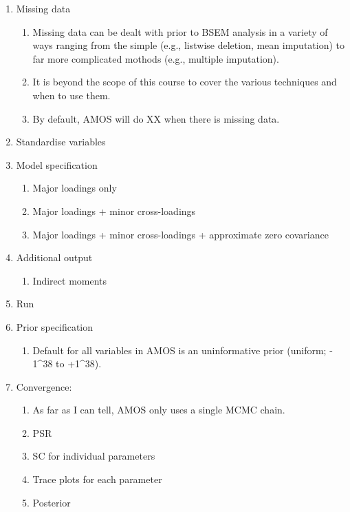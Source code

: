 \documentclass[
]{book}
\providecommand{\tightlist}{%
  \setlength{\itemsep}{0pt}\setlength{\parskip}{0pt}}
\begin{document}
\begin{enumerate}
\def\labelenumi{\arabic{enumi}.}
\tightlist
\item
  Missing data

  \begin{enumerate}
  \def\labelenumii{\arabic{enumii}.}
  \tightlist
  \item
    Missing data can be dealt with prior to BSEM analysis in a variety of ways ranging from the simple (e.g., listwise deletion, mean imputation) to far more complicated mothods (e.g., multiple imputation).
  \item
    It is beyond the scope of this course to cover the various techniques and when to use them.
  \item
    By default, AMOS will do XX when there is missing data.
  \end{enumerate}
\item
  Standardise variables
\item
  Model specification

  \begin{enumerate}
  \def\labelenumii{\arabic{enumii}.}
  \tightlist
  \item
    Major loadings only
  \item
    Major loadings + minor cross-loadings
  \item
    Major loadings + minor cross-loadings + approximate zero covariance
  \end{enumerate}
\item
  Additional output

  \begin{enumerate}
  \def\labelenumii{\arabic{enumii}.}
  \tightlist
  \item
    Indirect moments
  \end{enumerate}
\item
  Run
\item
  Prior specification

  \begin{enumerate}
  \def\labelenumii{\arabic{enumii}.}
  \tightlist
  \item
    Default for all variables in AMOS is an uninformative prior (uniform; - 1\^{}38 to +1\^{}38).
  \end{enumerate}
\item
  Convergence:

  \begin{enumerate}
  \def\labelenumii{\arabic{enumii}.}
  \tightlist
  \item
    As far as I can tell, AMOS only uses a single MCMC chain.
  \item
    PSR
  \item
    SC for individual parameters
  \item
    Trace plots for each parameter
  \item
    Posterior


\end{enumerate}
\end{enumerate}
\end{document}
